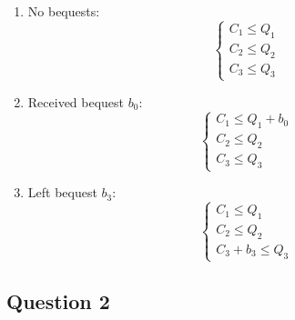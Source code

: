 \documentclass[11pt, oneside]{article}
\begin{document}
\begin{enumerate}[(1)]
	\item No bequests:
	\[
	\begin{cases}
	C_{1}  \le Q_{1}  \\
	C_{2}  \le Q_{2}  \\
	C_{3} \le Q_{3} 
	\end{cases}
	\]
	\item Received bequest $ b_{0} $:
	\[
	\begin{cases}
	C_{1}  \le Q_{1} + b_{0}  \\
	C_{2}  \le Q_{2}  \\
	C_{3} \le Q_{3} 
	\end{cases}
	\]
	\item Left bequest $ b_{3} $:
	\[
	\begin{cases}
	C_{1}  \le Q_{1}  \\
	C_{2}  \le Q_{2}  \\
	C_{3} + b_{3} \le Q_{3} 
	\end{cases}
	\]
\end{enumerate}

\subsection*{Question 2}
\end{document}

